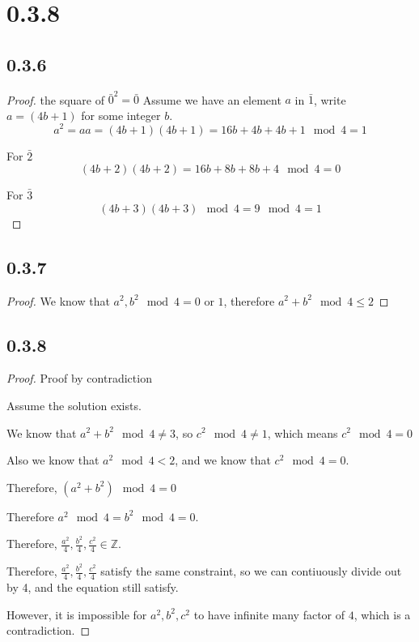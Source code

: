 \documentclass[11pt]{article}
\newcommand{\Z}{\mathbb{Z}}
\begin{document}
\section*{0.3.8}

\subsection*{0.3.6}

\begin{proof}
	the square of $\bar{0}^2=\bar{0}$
	Assume we have an element $a$ in $\bar{1}$, write $a=(4b+1)$ for some integer $b$.
	$$
		a^2 = aa = (4b+1) (4b + 1) = 16b + 4b + 4b + 1 \mod 4 = 1
	$$

	For $\bar{2}$
	$$
		(4b+2)(4b+2) = 16b+8b+8b+4 \mod 4 = 0
	$$

	For $\bar{3}$
	$$
		(4b+3)(4b+3) \mod 4 = 9 \mod 4 = 1
	$$
\end{proof}

\subsection*{0.3.7}

\begin{proof}
	We know that $a^2,b^2 \mod 4 = 0 \text{ or } 1$, therefore $a^2+b^2 \mod 4 \le 2$
\end{proof}

\subsection*{0.3.8}

\begin{proof}
	Proof by contradiction

	Assume the solution exists.

	We know that $a^2+b^2 \mod 4 \neq 3$, so $c^2 \mod 4 \neq 1$, which means $c^2 \mod 4=0$

	Also we know that $a^2\mod 4 < 2$, and we know that $c^2 \mod 4 = 0$.

	Therefore, $(a^2 + b^2) \mod 4 = 0$

	Therefore $a^2 \mod 4 = b^2 \mod 4 = 0$.

	Therefore, $\frac{a^2}{4}, \frac{b^2}{4}, \frac{c^2}{4} \in \Z$.

	Therefore, $\frac{a^2}{4}, \frac{b^2}{4}, \frac{c^2}{4}$ satisfy the same constraint,
	so we can contiuously divide out by 4, and the equation still satisfy.

	However, it is impossible for $a^2, b^2, c^2$ to have infinite many factor of $4$, which is a contradiction.

\end{proof}
\end{document}
